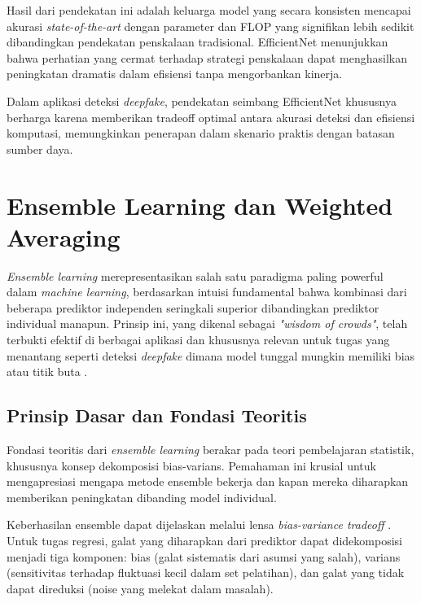 Hasil dari pendekatan ini adalah keluarga model yang secara konsisten mencapai akurasi \textit{state-of-the-art} dengan parameter dan FLOP yang signifikan lebih sedikit dibandingkan pendekatan penskalaan tradisional. EfficientNet menunjukkan bahwa perhatian yang cermat terhadap strategi penskalaan dapat menghasilkan peningkatan dramatis dalam efisiensi tanpa mengorbankan kinerja.

Dalam aplikasi deteksi \textit{deepfake}, pendekatan seimbang EfficientNet khususnya berharga karena memberikan tradeoff optimal antara akurasi deteksi dan efisiensi komputasi, memungkinkan penerapan dalam skenario praktis dengan batasan sumber daya.

\section{Ensemble Learning dan Weighted Averaging}

\textit{Ensemble learning} merepresentasikan salah satu paradigma paling powerful dalam \textit{machine learning}, berdasarkan intuisi fundamental bahwa kombinasi dari beberapa prediktor independen seringkali superior dibandingkan prediktor individual manapun. Prinsip ini, yang dikenal sebagai \textit{"wisdom of crowds"}, telah terbukti efektif di berbagai aplikasi dan khususnya relevan untuk tugas yang menantang seperti deteksi \textit{deepfake} dimana model tunggal mungkin memiliki bias atau titik buta \cite{dietterich2000ensemble}.

\subsection{Prinsip Dasar dan Fondasi Teoritis}

Fondasi teoritis dari \textit{ensemble learning} berakar pada teori pembelajaran statistik, khususnya konsep dekomposisi bias-varians. Pemahaman ini krusial untuk mengapresiasi mengapa metode ensemble bekerja dan kapan mereka diharapkan memberikan peningkatan dibanding model individual.

Keberhasilan ensemble dapat dijelaskan melalui lensa \textit{bias-variance tradeoff} \cite{breiman1996bias}. Untuk tugas regresi, galat yang diharapkan dari prediktor dapat didekomposisi menjadi tiga komponen: bias (galat sistematis dari asumsi yang salah), varians (sensitivitas terhadap fluktuasi kecil dalam set pelatihan), dan galat yang tidak dapat direduksi (noise yang melekat dalam masalah).

